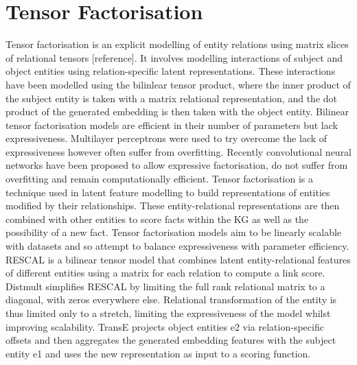 \section{Tensor Factorisation}
Tensor factorisation is an explicit modelling of entity relations using matrix slices of relational tensors [reference]. It involves modelling interactions of subject and object entities using relation-specific latent representations. These interactions have been modelled using the bilinlear tensor product, where the inner product of the subject entity is taken with a matrix relational representation, and the dot product of the generated embedding is then taken with the object entity. Bilinear tensor factorisation models are efficient in their number of parameters but lack expressiveness. Multilayer perceptrons were used to try overcome the lack of expressiveness however often suffer from overfitting. Recently convolutional neural networks have been proposed to allow expressive factorisation, do not suffer from overfitting and remain computationally efficient. \newline
Tensor factorisation is a technique used in latent feature modelling to build representations of entities modified by their relationships. These entity-relational representations are then combined with other entities to score facts within the KG as well as the possibility of a new fact. Tensor factorisation models aim to be linearly scalable with datasets and so attempt to balance expressiveness with parameter efficiency. \newline
RESCAL is a bilinear tensor model that combines latent entity-relational features of different entities using a matrix for each relation to compute a link score. \newline
Distmult simplifies RESCAL by limiting the full rank relational matrix to a diagonal, with zeros everywhere else. Relational transformation of the entity is thus limited only to a stretch, limiting the expressiveness of the model whilst improving scalability. \newline 
TransE projects object entities e2 via relation-specific offsets and then aggregates the generated embedding features with the subject entity e1 and uses the new representation as input to a scoring function. \newline

